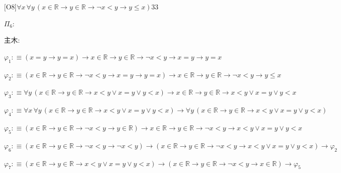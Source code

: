 \begin{fullproof}{[O8]}{$\forall x\,\forall y\,(x \in \mathbb{R} \to y \in \mathbb{R} \to \neg x < y \to y \leq x)$}{33}
\begin{ptree}
\end{ptree}
\noindent$\Pi_{6}$:
\begin{ptree}
\noLine
{}
\end{ptree}
\noindent 主木:
\begin{ptree}
\noLine
{}
\noLine
{}
\end{ptree}
\begin{abbrevlist}
\item $\varphi_{1} :\equiv (x = y \to y = x) \to x \in \mathbb{R} \to y \in \mathbb{R} \to \neg x < y \to x = y \to y = x$
\item $\varphi_{2} :\equiv (x \in \mathbb{R} \to y \in \mathbb{R} \to \neg x < y \to x = y \to y = x) \to x \in \mathbb{R} \to y \in \mathbb{R} \to \neg x < y \to y \leq x$
\item $\varphi_{3} :\equiv \forall y\,(x \in \mathbb{R} \to y \in \mathbb{R} \to x < y \lor x = y \lor y < x) \to x \in \mathbb{R} \to y \in \mathbb{R} \to x < y \lor x = y \lor y < x$
\item $\varphi_{4} :\equiv \forall x\,\forall y\,(x \in \mathbb{R} \to y \in \mathbb{R} \to x < y \lor x = y \lor y < x) \to \forall y\,(x \in \mathbb{R} \to y \in \mathbb{R} \to x < y \lor x = y \lor y < x)$
\item $\varphi_{5} :\equiv (x \in \mathbb{R} \to y \in \mathbb{R} \to \neg x < y \to y \in \mathbb{R}) \to x \in \mathbb{R} \to y \in \mathbb{R} \to \neg x < y \to x < y \lor x = y \lor y < x$
\item $\varphi_{6} :\equiv (x \in \mathbb{R} \to y \in \mathbb{R} \to \neg x < y \to \neg x < y) \to (x \in \mathbb{R} \to y \in \mathbb{R} \to \neg x < y \to x < y \lor x = y \lor y < x) \to \varphi_{2}$
\item $\varphi_{7} :\equiv (x \in \mathbb{R} \to y \in \mathbb{R} \to x < y \lor x = y \lor y < x) \to (x \in \mathbb{R} \to y \in \mathbb{R} \to \neg x < y \to x \in \mathbb{R}) \to \varphi_{5}$
\end{abbrevlist}
\end{fullproof}
